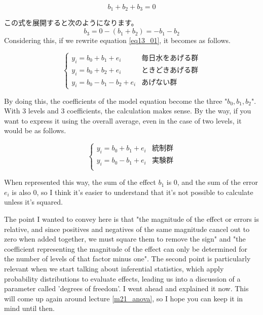 \documentclass{ltjbook}
\begin{document}
\[ b_1 + b_2 + b_3 = 0 \]

この式を展開すると次のようになります。
\[ b_3 = 0 - (b_1 + b_2) = -b_1 - b_2 \]
Considering this, if we rewrite equation \ref{eq13_01}, it becomes as follows.

\[
	\label{eq13_02}
	\begin{cases}
		y_i = b_0 + b_1 + e_i       & \mbox{毎日水をあげる群} \\
		y_i = b_0 + b_2 + e_i       & \mbox{ときどきあげる群} \\
		y_i = b_0 - b_1 - b_2 + e_i & \mbox{あげない群}
	\end{cases}
\]

By doing this, the coefficients of the model equation become the three "$b_0, b_1, b_2$". With 3 levels and 3 coefficients, the calculation makes sense.
By the way, if you want to express it using the overall average, even in the case of two levels, it would be as follows.

\[
	\begin{cases}
		y_i = b_0 + b_1 + e_i & \mbox{統制群} \\
		y_i = b_0 - b_1 + e_i & \mbox{実験群} \\
	\end{cases}
\]

When represented this way, the sum of the effect $b_1$ is 0, and the sum of the error $e_i$ is also 0, so I think it's easier to understand that it's not possible to calculate unless it's squared.

The point I wanted to convey here is that "the magnitude of the effect or errors is relative, and since positives and negatives of the same magnitude cancel out to zero when added together, we must square them to remove the sign" and "the coefficient representing the magnitude of the effect can only be determined for the number of levels of that factor minus one". The second point is particularly relevant when we start talking about inferential statistics, which apply probability distributions to evaluate effects, leading us into a discussion of a parameter called 'degrees of freedom'. I went ahead and explained it now. This will come up again around lecture \ref{m21_anova}, so I hope you can keep it in mind until then.
\end{document}
